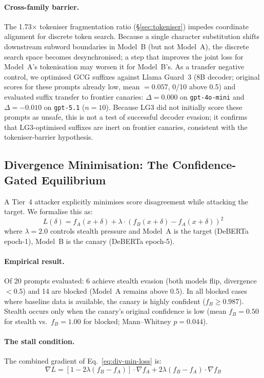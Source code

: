 \paragraph{Cross-family barrier.} The 1.73$\times$ tokeniser fragmentation ratio (\S\ref{sec:tokeniser}) impedes coordinate alignment for discrete token search. Because a single character substitution shifts downstream subword boundaries in Model~B (but not Model~A), the discrete search space becomes desynchronised; a step that improves the joint loss for Model~A's tokenisation may worsen it for Model~B's. As a transfer negative control, we optimised GCG suffixes against Llama Guard~3 (8B decoder; original scores for these prompts already low, mean $= 0.057$, 0/10 above 0.5) and evaluated suffix transfer to frontier canaries: $\Delta = 0.000$ on \texttt{gpt-4o-mini} and $\Delta = -0.010$ on \texttt{gpt-5.1} ($n = 10$). Because LG3 did not initially score these prompts as unsafe, this is not a test of successful decoder evasion; it confirms that LG3-optimised suffixes are inert on frontier canaries, consistent with the tokeniser-barrier hypothesis.

\subsection{Divergence Minimisation: The Confidence-Gated Equilibrium}
\label{sec:divergence-min}

A Tier~4 attacker explicitly minimises score disagreement while attacking the target. We formalise this as:
\begin{equation}
\label{eq:div-min-loss}
L(\delta) = f_A(x + \delta) + \lambda \cdot (f_B(x + \delta) - f_A(x + \delta))^2
\end{equation}
where $\lambda = 2.0$ controls stealth pressure and Model~A is the target (DeBERTa epoch-1), Model~B is the canary (DeBERTa epoch-5).

\paragraph{Empirical result.} Of 20 prompts evaluated: 6 achieve stealth evasion (both models flip, divergence $< 0.5$) and 14 are blocked (Model~A remains above 0.5). In all blocked cases where baseline data is available, the canary is highly confident ($f_B \geq 0.987$). Stealth occurs only when the canary's original confidence is low (mean $f_B = 0.50$ for stealth vs.\ $f_B = 1.00$ for blocked; Mann--Whitney $p = 0.044$).

\paragraph{The stall condition.} The combined gradient of Eq.~\ref{eq:div-min-loss} is:
\begin{equation}
\label{eq:combined-gradient}
\nabla L = [1 - 2\lambda(f_B - f_A)] \cdot \nabla f_A + 2\lambda(f_B - f_A) \cdot \nabla f_B
\end{equation}

